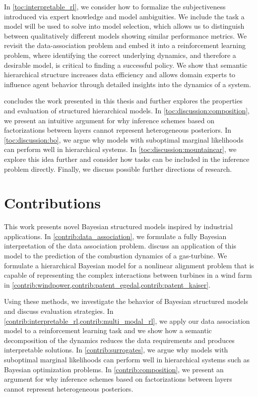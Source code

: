 In \cref{toc:interpretable_rl}, we consider how to formalize the subjectiveness introduced via expert knowledge and model ambiguities.
We include the task a model will be used to solve into model selection, which allows us to distinguish between qualitatively different models showing similar performance metrics.
We revisit the data-association problem and embed it into a reinforcement learning problem, where identifying the correct underlying dynamics, and therefore a desirable model, is critical to finding a successful policy.
We show that semantic hierarchical structure increases data efficiency and allows domain experts to influence agent behavior through detailed insights into the dynamics of a system.

 concludes the work presented in this thesis and further explores the properties and evaluation of structured hierarchical models.
In \cref{toc:discussion:composition}, we present an intuitive argument for why inference schemes based on factorizations between layers cannot represent heterogeneous posteriors.
In \cref{toc:discussion:bo}, we argue why models with suboptimal marginal likelihoods can perform well in hierarchical systems.
In \cref{toc:discussion:mountaincar}, we explore this idea further and consider how tasks can be included in the inference problem directly.
Finally, we discuss possible further directions of research.


\section{Contributions}
This work presents novel Bayesian structured models inspired by industrial applications.
In \cref{contrib:data_association}, we formulate a fully Bayesian interpretation of the data association problem.
 discuss an application of this model to the prediction of the combustion dynamics of a gas-turbine.
We formulate a hierarchical Bayesian model for a nonlinear alignment problem that is capable of representing the complex interactions between turbines in a wind farm in \cref{contrib:windpower,contrib:patent_egedal,contrib:patent_kaiser}.

Using these methods, we investigate the behavior of Bayesian structured models and discuss evaluation strategies.
In \cref{contrib:interpretable_rl,contrib:multi_modal_rl}, we apply our data association model to a reinforcement learning task and we show how a semantic decomposition of the dynamics reduces the data requirements and produces interpretable solutions.
In \cref{contrib:surrogates}, we argue why models with suboptimal marginal likelihoods can perform well in hierarchical systems such as Bayesian optimization problems.
In \cref{contrib:composition}, we present an argument for why inference schemes based on factorizations between layers cannot represent heterogeneous posteriors.


